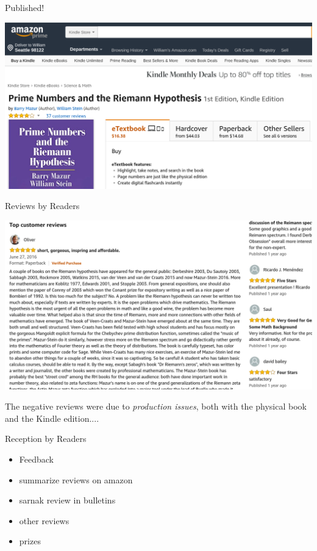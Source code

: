 \documentclass[draft]{beamer}
\begin{document}
\begin{frame}{Published!}

  \includegraphics[width=.98\textwidth]{pics/amazon-prime.png}

\end{frame}



\begin{frame}{Reviews by Readers}

  \includegraphics[width=.98\textwidth]{pics/amazon-review.png}

  \vfill

  The negative reviews were due to \textit{production issues}, both with the physical book
  and the Kindle edition....

\end{frame}

\begin{frame}{Reception by Readers}
  \begin{itemize}
    \item Feedback
    \item summarize reviews on amazon
    \item sarnak review in bulletins
    \item other reviews
    \item prizes
  \end{itemize}
\end{frame}
\end{document}
